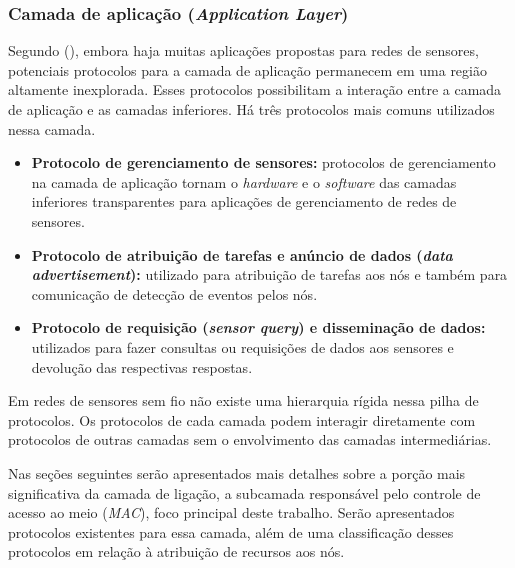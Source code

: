  \subsubsection{Camada de aplicação (\emph{Application Layer})}
 \label{sec:applicationLayer}
 
 Segundo  (\citeyear{Akyildiz2002}), embora haja muitas aplicações propostas para redes de sensores, potenciais protocolos para a camada de aplicação permanecem em uma região altamente inexplorada. Esses protocolos possibilitam a interação entre a camada de aplicação e as camadas inferiores. Há três protocolos mais comuns utilizados nessa camada. 
 
 \begin{itemize}
 \item \textbf{Protocolo de gerenciamento de sensores:} protocolos de gerenciamento na camada de aplicação tornam o \textit{hardware} e o \textit{software} das camadas inferiores transparentes para aplicações de gerenciamento de redes de sensores.
 \item \textbf{Protocolo de atribuição de tarefas e anúncio de dados (\textit{data advertisement}):} utilizado para atribuição de tarefas aos nós e também para comunicação de detecção de eventos pelos nós.
 \item \textbf{Protocolo de requisição (\textit{sensor query}) e disseminação de dados:} utilizados para fazer consultas ou requisições de dados aos sensores e devolução das respectivas respostas.
 \end{itemize}
 
Em redes de sensores sem fio não existe uma hierarquia rígida nessa pilha de protocolos. Os protocolos de cada camada podem interagir diretamente com protocolos de outras camadas sem o envolvimento das camadas intermediárias.

Nas seções seguintes serão apresentados mais detalhes sobre a porção mais significativa da camada de ligação, a subcamada responsável pelo controle de acesso ao meio (\emph{MAC}), foco principal deste trabalho. Serão apresentados protocolos existentes para essa camada, além de uma classificação desses protocolos em relação à atribuição de recursos aos nós.